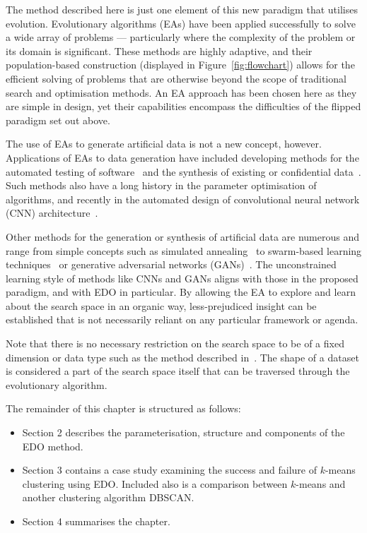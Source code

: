 
The method described here is just one element of this new paradigm that utilises
evolution. Evolutionary algorithms (EAs) have been applied successfully to solve
a wide array of problems --- particularly where the complexity of the problem or
its domain is significant. These methods are highly adaptive, and their
population-based construction (displayed in Figure~\ref{fig:flowchart}) allows
for the efficient solving of problems that are otherwise beyond the scope of
traditional search and optimisation methods. An EA approach has been chosen here
as they are simple in design, yet their capabilities encompass the difficulties
of the flipped paradigm set out above.


The use of EAs to generate artificial data is not a new concept, however.
Applications of EAs to data generation have included developing methods for the
automated testing of software~\cite{Koleejan2015,Michael2001,Sharifipour2018}
and the synthesis of existing or confidential data~\cite{Chen2016}. Such methods
also have a long history in the parameter optimisation of algorithms, and
recently in the automated design of convolutional neural network (CNN)
architecture~\cite{Suganuma2017,Sun2018}.

Other methods for the generation or synthesis of artificial data are numerous
and range from simple concepts such as simulated annealing~\cite{Matejka2017} to
swarm-based learning techniques~\cite{Abualigah2018b} or generative adversarial
networks (GANs)~\cite{Goodfellow2014}. The unconstrained learning style of
methods like CNNs and GANs aligns with those in the proposed paradigm, and with
EDO in particular. By allowing the EA to explore and learn about the search
space in an organic way, less-prejudiced insight can be established that is not
necessarily reliant on any particular framework or agenda.

Note that there is no necessary restriction on the search space to be of a fixed
dimension or data type such as the method described in~\cite{Chen2016}. The
shape of a dataset is considered a part of the search space itself that can be
traversed through the evolutionary algorithm.

The remainder of this chapter is structured as follows:
\begin{itemize}
    \item Section 2 describes the parameterisation, structure and components of
        the EDO method.
    \item Section 3 contains a case study examining the success and failure of
        \(k\)-means clustering using EDO. Included also is a comparison between
        \(k\)-means and another clustering algorithm DBSCAN.\
    \item Section 4 summarises the chapter.
\end{itemize}



